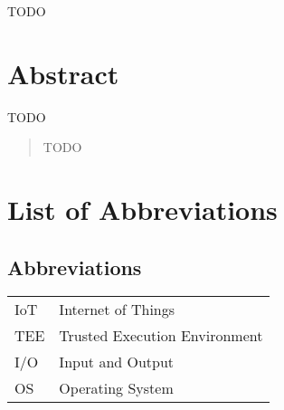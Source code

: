 \documentclass[master=cws,masteroption=vs]{kulemt}
\begin{document}
\begin{preface}
  TODO
\end{preface}

\tableofcontents*

\chapter*{Abstract}
TODO

\begin{abstract}
  TODO

\end{abstract}

\listoffigures
\chapter{List of Abbreviations}
\section*{Abbreviations}
\begin{flushleft}
  \renewcommand{\arraystretch}{1.1}
  \begin{tabularx}{\textwidth}{@{}p{12mm}X@{}}
    IoT   	& Internet of Things \\
    TEE   	& Trusted Execution Environment \\
    I/O   	& Input and Output \\
    	OS		& Operating System
    	
  \end{tabularx}
\end{flushleft}

\mainmatter










\appendixpage*          %
\appendix
%


\backmatter


\end{document}
